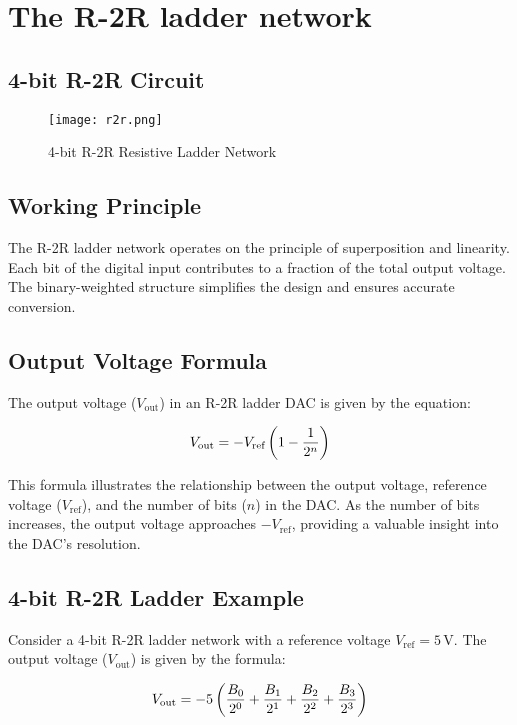 \documentclass{article}
\begin{document}
\section{The R-2R ladder network}
\fontsize{14}{16}\selectfont
\subsection{ 4-bit R-2R Circuit}

\begin{figure}[h]
    \centering
    \texttt{[image: r2r.png]}
    \caption{4-bit R-2R Resistive Ladder Network}
    \label{fig:r2r}
\end{figure}
\subsection{Working Principle}

The R-2R ladder network operates on the principle of superposition and linearity. Each bit of the digital input contributes to a fraction of the total output voltage. The binary-weighted structure simplifies the design and ensures accurate conversion.

\subsection{Output Voltage Formula}

The output voltage (\(V_{\text{out}}\)) in an R-2R ladder DAC is given by the equation:

\[\fontsize{10}{6}\selectfont
V_{\text{out}} = -V_{\text{ref}} \left(1 - \frac{1}{2^n}\right)
\]

This formula illustrates the relationship between the output voltage, reference voltage (\(V_{\text{ref}}\)), and the number of bits (\(n\)) in the DAC. As the number of bits increases, the output voltage approaches \(-V_{\text{ref}}\), providing a valuable insight into the DAC's resolution.
\subsection{4-bit R-2R Ladder Example}

Consider a 4-bit R-2R ladder network with a reference voltage \(V_{\text{ref}} = 5 \, \text{V}\). The output voltage (\(V_{\text{out}}\)) is given by the formula:

\[\fontsize{10}{6}\selectfont
V_{\text{out}} = -5 \left( \frac{B_0}{2^0} + \frac{B_1}{2^1} + \frac{B_2}{2^2} + \frac{B_3}{2^3} \right)
\]
\end{document}
